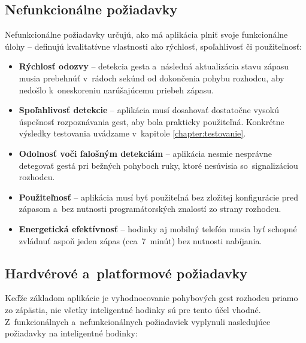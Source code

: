 \subsection{Nefunkcionálne požiadavky}
\label{subsec:nefunkcionalne-poziadavky}

Nefunkcionálne požiadavky určujú, ako má aplikácia
plniť svoje funkcionálne úlohy -- definujú kvalitatívne
vlastnosti ako rýchlosť, spoľahlivosť či použiteľnosť:

\begin{itemize}
  \item \textbf{Rýchlosť odozvy} -- detekcia gesta
        a~následná aktualizácia stavu zápasu musia
        prebehnúť v~rádoch sekúnd od dokončenia
        pohybu rozhodcu, aby nedošlo k~oneskoreniu
        narúšajúcemu priebeh zápasu.

  \item \textbf{Spoľahlivosť detekcie} -- aplikácia musí
        dosahovať dostatočne vysokú úspešnosť rozpoznávania
        gest, aby bola prakticky použiteľná. Konkrétne
        výsledky testovania uvádzame v~kapitole
        \ref{chapter:testovanie}.

  \item \textbf{Odolnosť voči falošným detekciám} --
        aplikácia nesmie nesprávne detegovať gestá pri
        bežných pohyboch ruky, ktoré nesúvisia
        so~signalizáciou rozhodcu.

  \item \textbf{Použiteľnosť} -- aplikácia musí byť
        použiteľná bez zložitej konfigurácie pred zápasom
        a~bez nutnosti programátorských znalostí zo strany
        rozhodcu.

  \item \textbf{Energetická efektívnosť} -- hodinky aj
        mobilný telefón musia byť schopné zvládnuť aspoň
        jeden zápas (cca~7~minút) bez nutnosti nabíjania.
\end{itemize}

\subsection{Hardvérové a~platformové požiadavky}
\label{subsec:hw-poziadavky}

Keďže základom aplikácie je vyhodnocovanie pohybových
gest rozhodcu priamo zo zápästia, nie všetky inteligentné
hodinky sú pre tento účel vhodné. Z~funkcionálnych
a~nefunkcionálnych požiadaviek vyplynuli nasledujúce
požiadavky na inteligentné hodinky:

